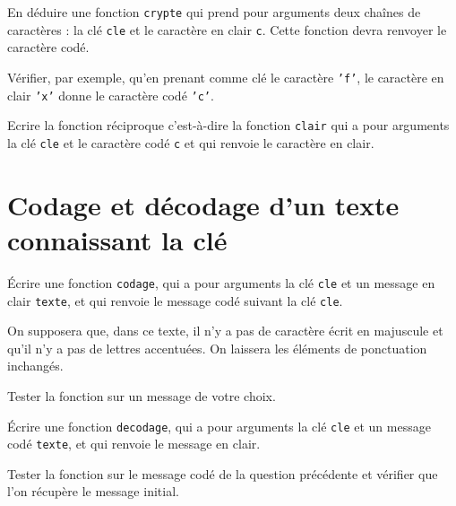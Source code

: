 \begin{question}
En déduire une fonction \texttt{crypte} qui prend pour arguments deux chaînes de caractères : la clé \texttt{cle} et le caractère en clair \texttt{c}. Cette fonction devra renvoyer le caractère codé.

Vérifier, par exemple, qu'en prenant comme clé le caractère \texttt{'f'}, le caractère en clair \texttt{'x'} donne le caractère codé \texttt{'c'}.
\end{question}

\begin{question}
Ecrire la fonction réciproque c'est-à-dire la fonction \texttt{clair} qui a pour arguments la clé \texttt{cle} et le caractère codé \texttt{c} et qui renvoie le caractère en clair.
\end{question}

\section{Codage et décodage d'un texte connaissant la clé}

\begin{question}
\'Ecrire une fonction \texttt{codage}, qui a pour arguments la clé \texttt{cle} et un message en clair \texttt{texte}, et qui renvoie le message codé suivant la clé \texttt{cle}. 
\end{question}

On supposera que, dans ce texte, il n'y a pas de caractère écrit en majuscule et qu'il n'y a pas de lettres accentuées. On laissera les éléments de ponctuation inchangés.

\begin{question}
Tester la fonction sur un message de votre choix.
\end{question}

\begin{question}
\'Ecrire une fonction \texttt{decodage}, qui a pour arguments la clé \texttt{cle} et un message codé \texttt{texte}, et qui renvoie le message en clair.
\end{question}

\begin{question}
Tester la fonction sur le message codé de la question précédente et vérifier que l'on récupère le message initial.
\end{question}

